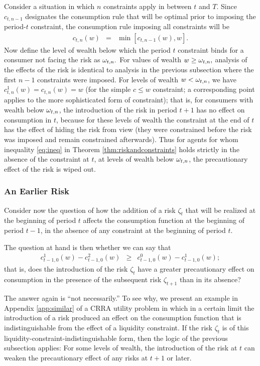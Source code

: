 Consider a situation in which $n$ constraints apply in between $t$ and $T$. Since $c_{t,n-1}$ designates the consumption rule that will be optimal prior to imposing the period-$t$ constraint, the consumption rule imposing all constraints will be
\begin{eqnarray}
c_{t,n}(w) & = & \min[c_{t,n-1}(w),w].
\end{eqnarray}
Now define the level of wealth below which the period $t$ constraint binds for a consumer not facing the risk as ${\omega}_{t,n}.$ For values of wealth $w \geq {\omega}_{t,n},$ analysis of the effects of the risk is identical to analysis in the previous subsection where the first $n-1$ constraints were imposed. For levels of wealth $w < {\omega}_{t,n}$, we have $c^{1}_{t,n}(w) = c_{t,n}(w)=w$ (for the simple $c \leq w$
constraint; a corresponding point applies to the more sophisticated form of constraint); that is, for consumers with wealth below ${\omega}_{t,n}$, the introduction of the risk in period $t+1$ has no effect on consumption in $t$, because for these levels of wealth the constraint at the end of $t$ has the effect of hiding the risk from view (they were constrained before the risk was imposed and remain constrained afterwards). Thus for agents for whom inequality \eqref{eq:ineq} in Theorem \ref{thm:riskandconstraints} holds strictly in the absence of the constraint at $t$, at levels of wealth below ${\omega}_{t,n}$, the precautionary effect of the risk is wiped out.

\subsubsection{An Earlier Risk}\label{subsubsec:AnEarlierRisk}

Consider now the question of how the addition of a risk $\zeta_{t}$ that will be realized at the beginning of period $t$ affects the consumption function at the beginning of period $t-1$, in the absence of any constraint at the beginning of period $t$.

The question at hand is then whether we can say that
\begin{eqnarray}
  \label{eq:earlierrisk}
  c_{t-1,0}^{1}(w)-c_{t-1,0}^{2}(w) & \geq & c_{t-1,0}^0(w)-c^{1}_{t-1,0}(w);
\end{eqnarray}
that is, does the introduction of the risk $\zeta_{t}$ have a greater precautionary effect on consumption in the presence of the subsequent risk $\zeta_{t+1}$ than in its absence?

The answer again is ``not necessarily.''  To see why, we present an example in Appendix \ref{app:similar} of a CRRA utility problem in which in a certain limit the introduction of a risk produced an effect on the consumption function that is indistinguishable from the effect of a liquidity constraint.  If the risk $\zeta_{t}$ is of this liquidity-constraint-indistinguishable form, then the logic of the previous subsection applies: For some levels of wealth, the introduction of the risk at $t$ can weaken the precautionary effect of any risks at $t+1$ or later.

